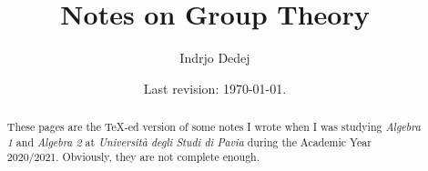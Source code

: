 



\title{Notes on Group Theory}
\author{Indrjo Dedej}
\date{Last revision: \today{}.}



\maketitle

\begin{abstract}
These pages are the \TeX{}-ed version of some notes I wrote when I was studying {\em Algebra 1} and {\em Algebra 2} at {\em Università degli Studi di Pavia} during the Academic Year 2020/2021. Obviously, they are not complete enough.
\end{abstract}

\tableofcontents








%




